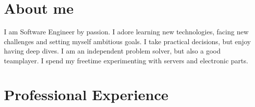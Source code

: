 \documentclass[11pt]{article}
\begin{document}
\hspace{0.05\textwidth}
\begin{minipage}[t]{0.65\textwidth}

  \section*{About me}
  I am Software Engineer by passion. I adore learning new technologies, facing 
  new challenges and setting myself ambitious goals. I take practical 
  decisions, but enjoy having deep dives. I am an independent problem solver, 
  but also a good teamplayer. I spend my freetime experimenting with servers and electronic parts.

  \section*{Professional Experience}
  \newcommand{\job}[5]{
    \multirow{2}{*}{\shortstack[r]{\small#3\\ \small#4}} & \normalsize\textbf{#1}, \textit{#2} \\
    &\begin{compactitem}
      #5
    \end{compactitem} \\
  }


\end{minipage}
\end{document}
